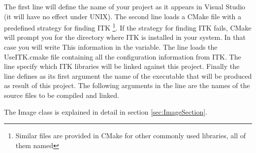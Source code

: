 The first line will define the name of your project as it appears in Visual
Studio (it will have no effect under UNIX). The second line loads a CMake
file with a predefined strategy for finding ITK \footnote{Similar files are
provided in CMake for other commonly used libraries, all of them named
}. If the strategy for finding ITK fails, CMake will prompt
you for the directory where ITK is installed in your system. In that case you
will write This information in the  variable. The line  loads the UseITK.cmake file containing all the
configuration information from ITK. The  line specify
which ITK libraries will be linked against this project. Finally the line
 defines as its first argument the name of the executable
that will be produced as result of this project. The following arguments in the
line are the names of the source files to be compiled and linked.



The Image class is explained in detail in section \ref{sec:ImageSection}.


